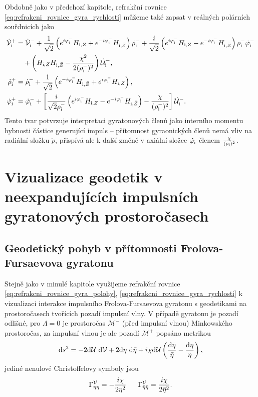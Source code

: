 Obdobně jako v předchozí kapitole, refrakční rovnice \eqref{eq:refrakcni_rovnice_gyra_rychlosti} můžeme také zapsat v reálných
polárních souřdnicích jako
\begin{equation}
    \begin{split}
    \dot{\mathcal{V}}_{\mathrm{i}}^{+} &= \dot{\mathcal{V}}_{\mathrm{i}}^{-} + \frac{1}{\sqrt{2}} \left(e^{i \varphi_{\mathrm{i}}^{-}} H_{\mathrm{i}, Z} + e^{-i \varphi_{\mathrm{i}}^{-}} H_{\mathrm{i}, \bar{Z}}\right) \dot{\rho}_{\mathrm{i}}^{-} +
    \frac{i}{\sqrt{2}} \left( e^{i \varphi_{\mathrm{i}}^{-}} H_{\mathrm{i}, Z} - e^{-i \varphi_{\mathrm{i}}^{-}} H_{\mathrm{i}, \bar{Z}} \right) \rho_{\mathrm{i}}^{-} \dot{\varphi}_{\mathrm{i}}^{-} \\
    &~~~+ \left(H_{\mathrm{i}, Z} H_{\mathrm{i}, \bar{Z}} - \frac{\chi^2}{2(\rho_{\mathrm{i}}^{-})^2}\right)\dot{\mathcal{U}}_{\mathrm{i}}^{-}, \\
    \dot{\rho}_{\mathrm{i}}^{+} &= \dot{\rho}_{\mathrm{i}}^{-} + \frac{1}{\sqrt{2}} \left(e^{-i \varphi_{\mathrm{i}}^{-}} H_{\mathrm{i}, \bar{Z}} + e^{i \varphi_{\mathrm{i}}^{-}} H_{\mathrm{i}, Z} \right), \\
    \dot{\varphi}_{\mathrm{i}}^{+} &= \dot{\varphi}_{\mathrm{i}}^{-} + \left[ \frac{i}{\sqrt{2} \rho_{\mathrm{i}}^{-}} \left(e^{i \varphi_{\mathrm{i}}^{-}} H_{\mathrm{i}, Z} - e^{-i \varphi_{\mathrm{i}}^{-}} H_{\mathrm{i}, \bar{Z}} \right) - \frac{\chi}{(\rho_{\mathrm{i}}^{-})^2}\right] \dot{\mathcal{U}}_{\mathrm{i}}^{-}.
    \end{split}
\end{equation}
Tento tvar potvrzuje interpretaci gyratonových členů jako interního momentu hybnosti částice generující impuls -- 
přítomnost gyraonických členů nemá vliv na radiální složku $\dot{\rho}$, přispívá ale k další změně v
axiální složce $\dot{\varphi_{\mathrm{i}}}$ členem $\frac{\chi}{(\rho_{\mathrm{i}})^2}$.

\section{Vizualizace geodetik v neexpandujících impulsních gyratonových prostoročasech}
\subsection{Geodetický pohyb v přítomnosti Frolova-Fursaevova gyratonu}

Stejně jako v minulé kapitole využijeme refrakční rovnice \eqref{eq:refrakcni_rovnice_gyra_polohy}, \eqref{eq:refrakcni_rovnice_gyra_rychlosti}
k vizualizaci interakce impulsního Frolova-Fursaevova gyratonu s geodetikami na prostoročasech tvořících pozadí impulsní vlny.
V případě gyratonu je pozadí odlišné, pro $\Lambda = 0$ je prostoročas $\mathcal{M}^{-}$ (před impulsní vlnou) Minkowského prostoročas,
za impulsní vlnou je ale pozadí $\mathcal{M}^+$ popsáno metrikou
\begin{equation}
    \mathrm{d} s^2 = - 2 \mathrm{d} \mathcal{U} ~ \mathrm{d} \mathcal{V} + 2 \mathrm{d} \eta ~ \mathrm{d} \bar{\eta} + i \chi \mathrm{d} \mathcal{U} \left(\frac{\mathrm{d} \bar{\eta}}{\bar{\eta}} - \frac{\mathrm{d} \eta}{\eta}\right),
\end{equation}
jediné nenulové Christoffelovy symboly jsou
\begin{equation}
    \Gamma^{\mathcal{V}}_{\eta \eta} = - \frac{i \chi}{2 \eta^2} ~~~~~ \Gamma^{\mathcal{V}}_{\bar{\eta}\bar{\eta}} = \frac{i \chi}{2 \bar{\eta}^2}.
\end{equation}

